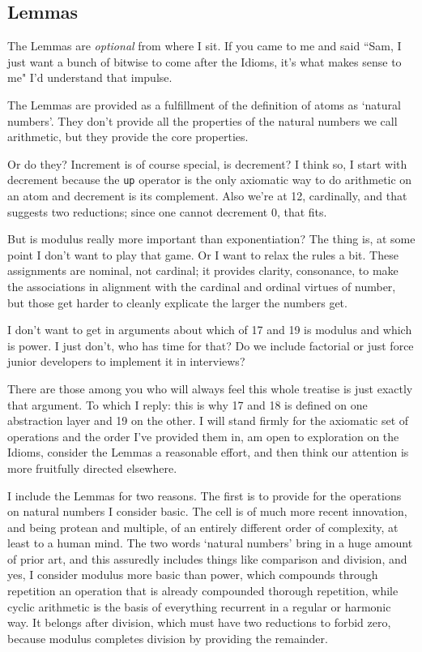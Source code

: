 \documentclass[twoside]{article}
\begin{document}
\subsection{Lemmas}

The Lemmas are \emph{optional} from where I sit. If you came to me and said ``Sam, I just want a bunch of bitwise to come after the Idioms, it's what makes sense to me" I'd understand that impulse.

The Lemmas are provided as a fulfillment of the definition of atoms as `natural numbers'. They don't provide all the properties of the natural numbers we call arithmetic, but they provide the core properties.

Or do they? Increment is of course special, is decrement? I think so, I start with decrement because the \texttt{up} operator is the only axiomatic way to do arithmetic on an atom and decrement is its complement. Also we're at 12, cardinally, and that suggests two reductions; since one cannot decrement 0, that fits.

But is modulus really more important than exponentiation? The thing is, at some point I don't want to play that game. Or I want to relax the rules a bit. These assignments are nominal, not cardinal; it provides clarity, consonance, to make the associations in alignment with the cardinal and ordinal virtues of number, but those get harder to cleanly explicate the larger the numbers get.

I don't want to get in arguments about which of 17 and 19 is modulus and which is power. I just don't, who has time for that? Do we include factorial or just force junior developers to implement it in interviews?

There are those among you who will always feel this whole treatise is just exactly that argument. To which I reply: this is why 17 and 18 is defined on one abstraction layer and 19 on the other. I will stand firmly for the axiomatic set of operations and the order I've provided them in, am open to exploration on the Idioms, consider the Lemmas a reasonable effort, and then think our attention is more fruitfully directed elsewhere.

I include the Lemmas for two reasons. The first is to provide for the operations on natural numbers I consider basic. The cell is of much more recent innovation, and being protean and multiple, of an entirely different order of complexity, at least to a human mind. The two words `natural numbers' bring in a huge amount of prior art, and this assuredly includes things like comparison and division, and yes, I consider modulus more basic than power, which compounds through repetition an operation that is already compounded thorough repetition, while cyclic arithmetic is the basis of everything recurrent in a regular or harmonic way. It belongs after division, which must have two reductions to forbid zero, because modulus completes division by providing the remainder.
\end{document}
